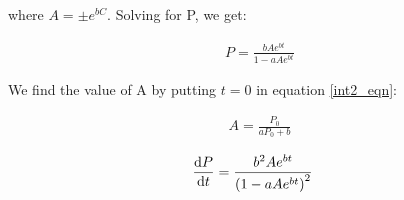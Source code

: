\documentclass[12pt]{article}
\begin{document}
where $A = \pm e^{bC}$. Solving for P, we get:

\begin{align*}
P = \frac{bAe^{bt}}{1 - aAe^{bt}}
\end{align*}

We find the value of A by putting $t = 0$ in equation \ref{int2_eqn}:

\begin{align*}
A = \frac{P_0}{aP_0 + b}
\end{align*}

\begin{align*}
\diff{P}{t} &= \dfrac{b^2Ae^{bt}}{\left ( 1 - aAe^{bt} \right ) ^2}
\end{align*}
\end{document}
